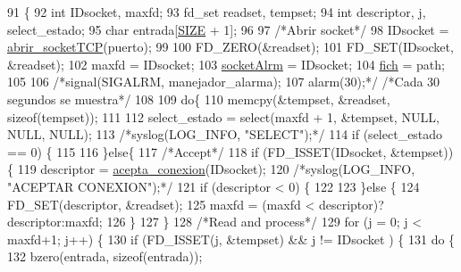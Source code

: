 \begin{DoxyCode}
91                                      \{
92         \textcolor{keywordtype}{int} IDsocket, maxfd;
93         fd\_set readset, tempset;
94         \textcolor{keywordtype}{int} descriptor, j, select\_estado;
95         \textcolor{keywordtype}{char} entrada[\hyperlink{_g-2361-06-_p1-_server_8h_a70ed59adcb4159ac551058053e649640}{SIZE} + 1];     
96 
97         \textcolor{comment}{/*Abrir socket*/}
98         IDsocket = \hyperlink{_g-2361-06-_p1-_sockets_8h_af2f55f83053c8fdebb8da511cd65880c}{abrir\_socketTCP}(puerto);
99 
100         FD\_ZERO(&readset);
101         FD\_SET(IDsocket, &readset);
102         maxfd = IDsocket;
103         \hyperlink{_g-2361-06-_p1-_server_8c_a882bc4c5a2b02dd85d4716961c4d902f}{socketAlrm} = IDsocket;
104         \hyperlink{_g-2361-06-_p1-_server_8c_a5666511ca3d4a3dc685c6f14c663aed5}{fich} = path;
105 
106         \textcolor{comment}{/*signal(SIGALRM, manejador\_alarma);}
107 \textcolor{comment}{        alarm(30);*/} \textcolor{comment}{/*Cada 30 segundos se muestra*/}
108 
109         \textcolor{keywordflow}{do}\{
110                 memcpy(&tempset, &readset, \textcolor{keyword}{sizeof}(tempset));
111           
112                 select\_estado = select(maxfd + 1, &tempset, NULL, NULL, NULL);
113                 \textcolor{comment}{/*syslog(LOG\_INFO, "SELECT");*/}
114                 \textcolor{keywordflow}{if} (select\_estado == 0) \{
115                         
116                 \}\textcolor{keywordflow}{else}\{
117                         \textcolor{comment}{/*Accept*/}
118                         \textcolor{keywordflow}{if} (FD\_ISSET(IDsocket, &tempset)) \{
119                          descriptor = \hyperlink{_g-2361-06-_p1-_sockets_8h_a172e85f036cff044fd5ba218460115c7}{acepta\_conexion}(IDsocket);
120                          \textcolor{comment}{/*syslog(LOG\_INFO, "ACEPTAR CONEXION");*/}
121                          \textcolor{keywordflow}{if} (descriptor < 0) \{
122 
123                          \}\textcolor{keywordflow}{else} \{
124                             FD\_SET(descriptor, &readset);
125                             maxfd = (maxfd < descriptor)?descriptor:maxfd;
126                          \}
127                 \}
128                 \textcolor{comment}{/*Read and process*/}
129                 \textcolor{keywordflow}{for} (j = 0; j < maxfd+1; j++) \{
130                         \textcolor{keywordflow}{if} (FD\_ISSET(j, &tempset) && j != IDsocket ) \{
131                             \textcolor{keywordflow}{do} \{
132                                bzero(entrada, \textcolor{keyword}{sizeof}(entrada));

\end{DoxyCode}
